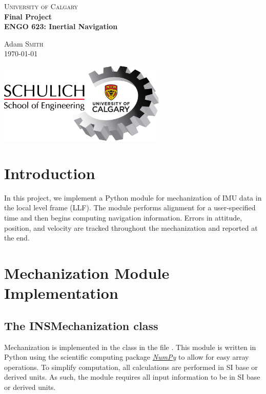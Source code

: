 \documentclass[11pt, oneside]{article}   	%
\begin{document}
\begin{titlepage}

	\center
	\textsc{\LARGE University of Calgary}\\[1.5cm]
	\vfill
	{\huge\bfseries Final Project}\\[0.4cm]
	{\huge\bfseries ENGO 623: Inertial Navigation}
	
	\vfill\vfill\vfill\vfill
	
	Adam \textsc{Smith}\\
	
	\vfill\vfill\vfill
	{\large \today}
	
	\vfill\vfill\vfill
	\includegraphics[width=8cm,]{img/schulich.png}\\[1cm]	
\end{titlepage}

\section{Introduction}
In this project, we implement a Python module for mechanization of IMU data in the local level frame (LLF).  The module performs alignment for a user-specified time and then begins computing navigation information. Errors in attitude, position, and velocity are tracked throughout the mechanization and reported at the end.

\section{Mechanization Module Implementation}

\subsection{The INSMechanization class}
Mechanization is implemented in the  class in the file .  This module is written in Python using the scientific computing package \href{https://numpy.org}{\textit{NumPy}} to allow for easy array operations.  To simplify computation, all calculations are performed in SI base or derived units. As such, the module requires all input information to be in SI base or derived units.  
\end{document}
